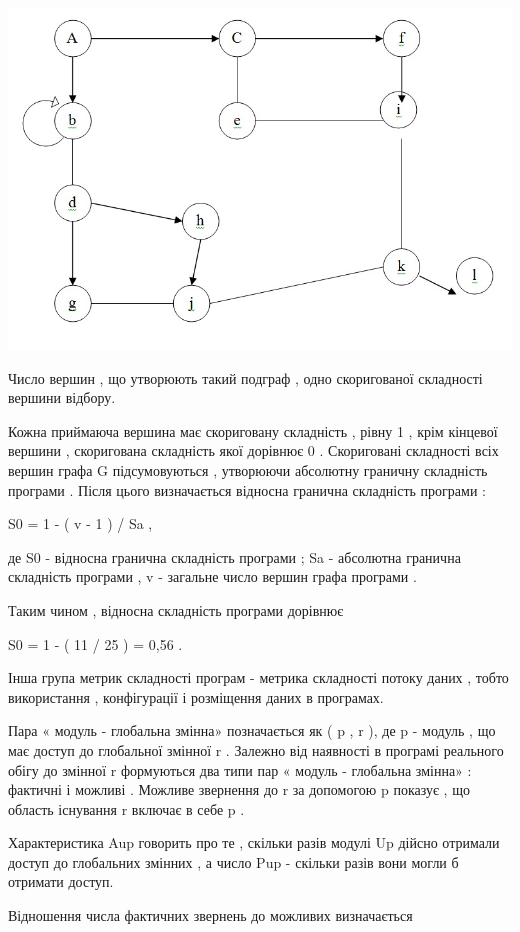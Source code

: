 \documentclass[oneside,final,14pt]{extreport}
\begin{document}
\includegraphics{metrics_Jilb_1.jpg}

Число вершин , що утворюють такий подграф , одно скоригованої складності вершини відбору.

Кожна приймаюча вершина має скориговану складність , рівну 1 , крім кінцевої вершини , скоригована складність якої дорівнює 0 . Скориговані складності всіх вершин графа G підсумовуються , утворюючи абсолютну граничну складність програми . Після цього визначається відносна гранична складність програми :

S0 = 1 - ( v - 1 ) / Sa ,

де S0 - відносна гранична складність програми ; Sa - абсолютна гранична складність програми , v - загальне число вершин графа програми .

Таким чином , відносна складність програми дорівнює

S0 = 1 - ( 11 / 25 ) = 0,56 .

Інша група метрик складності програм - метрика складності потоку даних , тобто використання , конфігурації і розміщення даних в програмах.

Пара « модуль - глобальна змінна» позначається як ( p , r ), де p - модуль , що має доступ до глобальної змінної r . Залежно від наявності в програмі реального обігу до змінної r формуються два типи пар « модуль - глобальна змінна» : фактичні і можливі . Можливе звернення до r за допомогою p показує , що область існування r включає в себе p .

Характеристика Aup говорить про те , скільки разів модулі Up дійсно отримали доступ до глобальних змінних , а число Pup - скільки разів вони могли б отримати доступ.

Відношення числа фактичних звернень до можливих визначається
\end{document}
